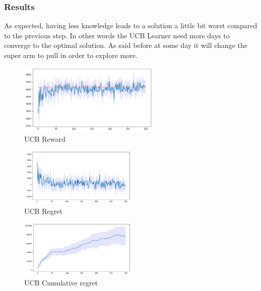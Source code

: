\subsubsection{Results}
As expected, having less knowledge leads to a solution a little bit worst compared to the previous step. In other words the UCB Learner need more days to converge to the optimal solution. As said before at some day it will change the super arm to pull in order to explore more.
\begin{figure}[ht]
    \begin{center}
    \includegraphics[width=0.6\textwidth]{img/UCB4.png}
    \caption{UCB Reward}
    \label{fig:reward41}
    \end{center}
\end{figure}
\begin{multicols}{2}
    \begin{figure}[H]
        \begin{center}
        \includegraphics[width=0.5\textwidth]{img/UCB4_regret.png}
        \caption{UCB Regret}
        \label{fig:regret41}
        \end{center}
    \end{figure}
    \columnbreak
    \begin{figure}[H]
        \begin{center}
        \includegraphics[width=0.5\textwidth]{img/UCB4_cum_reg.png}
        \caption{UCB Cumulative regret}
        \label{fig:cum_reg41}
        \end{center}
    \end{figure}
\end{multicols}

